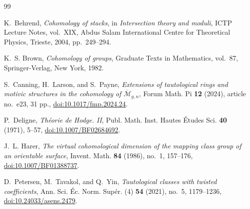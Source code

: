 \documentclass[11pt,reqno]{amsart}
\theoremstyle{definition}
\theoremstyle{remark}
\begin{document}
\begin{thebibliography}{99}

K.~Behrend,
\emph{Cohomology of stacks},
in \emph{Intersection theory and moduli}, ICTP Lecture Notes, vol.~XIX,
Abdus Salam International Centre for Theoretical Physics, Trieste, 2004,
pp.~249--294.

K.~S. Brown,
\emph{Cohomology of groups},
Graduate Texts in Mathematics, vol.~87, Springer-Verlag, New York, 1982.

S.~Canning, H.~Larson, and S.~Payne,
\emph{Extensions of tautological rings and motivic structures in the
cohomology of $\overline{\mathcal M}_{g,n}$},
Forum Math. Pi \textbf{12} (2024), article no.~e23, 31 pp.,
\href{https://doi.org/10.1017/fmp.2024.24}{doi:10.1017/fmp.2024.24}.

P.~Deligne,
\emph{Th\'eorie de Hodge. II},
Publ. Math. Inst. Hautes \'Etudes Sci. \textbf{40} (1971), 5--57,
\href{https://doi.org/10.1007/BF02684692}{doi:10.1007/BF02684692}.

J.~L. Harer,
\emph{The virtual cohomological dimension of the mapping class group of an
orientable surface},
Invent. Math. \textbf{84} (1986), no.~1, 157--176,
\href{https://doi.org/10.1007/BF01388737}{doi:10.1007/BF01388737}.

D.~Petersen, M.~Tavakol, and Q.~Yin,
\emph{Tautological classes with twisted coefficients},
Ann. Sci. \'Ec. Norm. Sup\'er. (4) \textbf{54} (2021), no.~5, 1179--1236,
\href{https://doi.org/10.24033/asens.2479}{doi:10.24033/asens.2479}.

\end{thebibliography}
\end{document}

